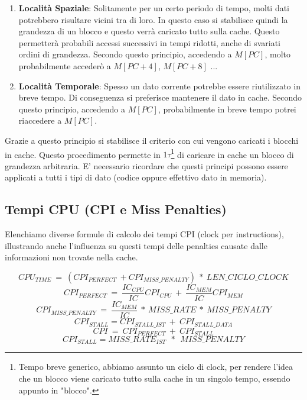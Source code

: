 \documentclass{article}
\begin{document}
\begin{enumerate}
    \item \textbf{Località Spaziale}: Solitamente per un certo periodo di tempo, molti dati potrebbero risultare vicini tra di loro. In questo caso si stabilisce quindi la grandezza di un blocco e questo verrà caricato tutto sulla cache. Questo permetterà probabili accessi successivi in tempi ridotti, anche di svariati ordini di grandezza.
    Secondo questo principio, accedendo a $M[PC]$, molto probabilmente accederò a $M[PC+4]$, $M[PC+8]$ ... 
    \item \textbf{Località Temporale}: Spesso un dato corrente potrebbe essere riutilizzato in breve tempo. Di conseguenza si preferisce mantenere il dato in cache. Secondo questo principio, accedendo a $M[PC]$, probabilmente in breve tempo potrei riaccedere a $M[PC]$.
\end{enumerate}

Grazie a questo principio si stabilisce il criterio con cui vengono caricati i blocchi in cache. Questo procedimento permette in $1\tau$\footnote{Tempo breve generico, abbiamo assunto un ciclo di clock, per rendere l'idea che un blocco viene caricato tutto sulla cache in un singolo tempo, essendo appunto in "blocco".} di caricare in cache un blocco di grandezza arbitraria. E' necessario ricordare che questi principi possono essere applicati a tutti i tipi di dato (codice oppure effettivo dato in memoria).

\subsection{Tempi CPU (CPI e Miss Penalties)}

Elenchiamo diverse formule di calcolo dei tempi CPI (clock per instructions), illustrando anche l'influenza su questi tempi delle penalties causate dalle informazioni non trovate nella cache.

\[ CPU_{TIME} \: = \: (CPI_{PERFECT} \: + CPI_{MISS\_PENALTY}) \: * \: LEN\_CICLO\_CLOCK  \]
\vspace*{-10px}
\[ CPI_{PERFECT} \: = \: \frac{IC_{CPU}}{IC}CPI_{CPU} \: + \: \frac{IC_{MEM}}{IC}CPI_{MEM}\]
\vspace*{-10px}
\[ CPI_{MISS\_PENALTY} \: = \: \frac{IC_{MEM}}{IC} \: * \: MISS\_RATE \: * \: MISS\_PENALTY  \]
\vspace*{-10px}
\[ CPI_{STALL} = CPI_{STALL\_IST} \: + \: CPI_{STALL\_DATA} \]
\vspace*{-10px}
\[ CPI \: = \: CPI_{PERFECT} \: + \: CPI_{STALL} \]
\vspace*{-10px}
\[ CPI_{STALL} = MISS\_RATE_{IST} \: \:*  \: \: MISS\_PENALTY\]
\vspace{5px}
\end{document}
